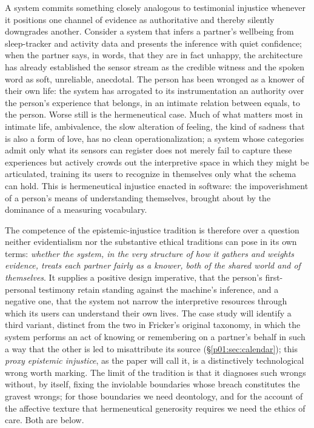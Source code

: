 A system commits something closely analogous to testimonial injustice whenever it positions one channel of evidence as authoritative and thereby silently downgrades another. Consider a system that infers a partner's wellbeing from sleep-tracker and activity data and presents the inference with quiet confidence; when the partner says, in words, that they are in fact unhappy, the architecture has already established the sensor stream as the credible witness and the spoken word as soft, unreliable, anecdotal. The person has been wronged as a knower of their own life: the system has arrogated to its instrumentation an authority over the person's experience that belongs, in an intimate relation between equals, to the person. Worse still is the hermeneutical case. Much of what matters most in intimate life, ambivalence, the slow alteration of feeling, the kind of sadness that is also a form of love, has no clean operationalization; a system whose categories admit only what its sensors can register does not merely fail to capture these experiences but actively crowds out the interpretive space in which they might be articulated, training its users to recognize in themselves only what the schema can hold. This is hermeneutical injustice enacted in software: the impoverishment of a person's means of understanding themselves, brought about by the dominance of a measuring vocabulary.

The competence of the epistemic-injustice tradition is therefore over a question neither evidentialism nor the substantive ethical traditions can pose in its own terms: \emph{whether the system, in the very structure of how it gathers and weights evidence, treats each partner fairly as a knower, both of the shared world and of themselves}. It supplies a positive design imperative, that the person's first-personal testimony retain standing against the machine's inference, and a negative one, that the system not narrow the interpretive resources through which its users can understand their own lives. The case study will identify a third variant, distinct from the two in Fricker's original taxonomy, in which the system performs an act of knowing or remembering on a partner's behalf in such a way that the other is led to misattribute its source (§\ref{p01:sec:calendar}); this \emph{proxy epistemic injustice}, as the paper will call it, is a distinctively technological wrong worth marking. The limit of the tradition is that it diagnoses such wrongs without, by itself, fixing the inviolable boundaries whose breach constitutes the gravest wrongs; for those boundaries we need deontology, and for the account of the affective texture that hermeneutical generosity requires we need the ethics of care. Both are below.

